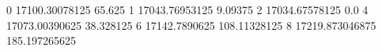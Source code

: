 0 17100.30078125 65.625
1 17043.76953125 9.09375
2 17034.67578125 0.0
4 17073.00390625 38.328125
6 17142.7890625 108.11328125
8 17219.873046875 185.197265625
